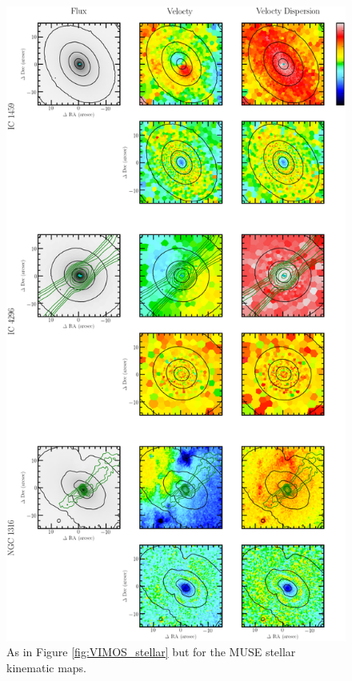 		\begin{figure}
			\centering
			\includegraphics[height=0.94\textheight]{chapter4/muse/kin1.png}
			\caption[MUSE stellar kinematic maps]{As in Figure \ref{fig:VIMOS_stellar} but for the MUSE stellar kinematic maps.}
			\label{fig:MUSE_stellar}
		\end{figure}
